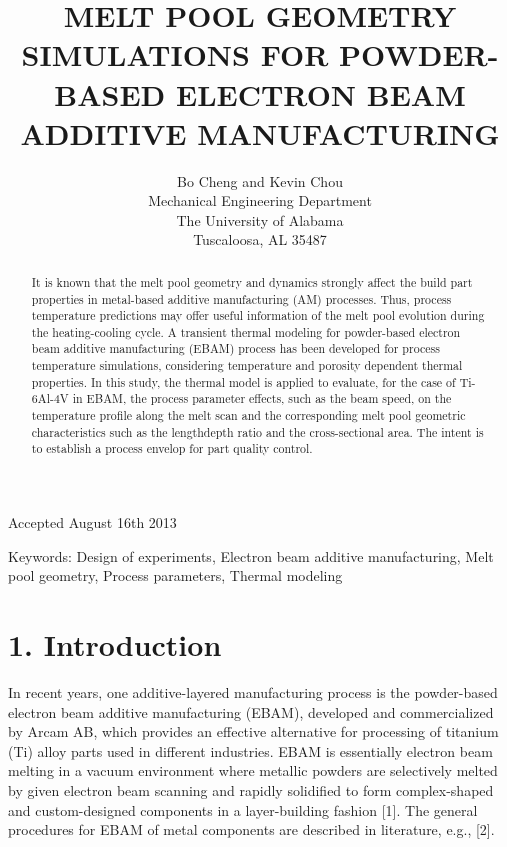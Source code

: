 \documentclass[10pt]{article}
\title{MELT POOL GEOMETRY SIMULATIONS FOR POWDER-BASED ELECTRON BEAM ADDITIVE MANUFACTURING }
\author{Bo Cheng and Kevin Chou\\
Mechanical Engineering Department\\
The University of Alabama\\
Tuscaloosa, AL 35487}
\date{}
\begin{document}
\maketitle
Accepted August 16th 2013

\begin{abstract}
It is known that the melt pool geometry and dynamics strongly affect the build part properties in metal-based additive manufacturing (AM) processes. Thus, process temperature predictions may offer useful information of the melt pool evolution during the heating-cooling cycle. A transient thermal modeling for powder-based electron beam additive manufacturing (EBAM) process has been developed for process temperature simulations, considering temperature and porosity dependent thermal properties. In this study, the thermal model is applied to evaluate, for the case of Ti-6Al-4V in EBAM, the process parameter effects, such as the beam speed, on the temperature profile along the melt scan and the corresponding melt pool geometric characteristics such as the lengthdepth ratio and the cross-sectional area. The intent is to establish a process envelop for part quality control.
\end{abstract}

Keywords: Design of experiments, Electron beam additive manufacturing, Melt pool geometry, Process parameters, Thermal modeling

\section*{1. Introduction}
In recent years, one additive-layered manufacturing process is the powder-based electron beam additive manufacturing (EBAM), developed and commercialized by Arcam AB, which provides an effective alternative for processing of titanium (Ti) alloy parts used in different industries. EBAM is essentially electron beam melting in a vacuum environment where metallic powders are selectively melted by given electron beam scanning and rapidly solidified to form complex-shaped and custom-designed components in a layer-building fashion [1]. The general procedures for EBAM of metal components are described in literature, e.g., [2].
\end{document}
